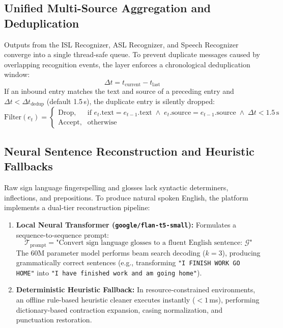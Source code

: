 \documentclass[12pt,a4paper]{report}
\begin{document}
\subsection{Unified Multi-Source Aggregation and Deduplication}
Outputs from the ISL Recognizer, ASL Recognizer, and Speech Recognizer converge into a single thread-safe queue. To prevent duplicate messages caused by overlapping recognition events, the layer enforces a chronological deduplication window:
\begin{equation}
\Delta t = t_{\text{current}} - t_{\text{last}}
\end{equation}
If an inbound entry matches the text and source of a preceding entry and $\Delta t < \Delta t_{\text{dedup}}$ (default 1.5\,s), the duplicate entry is silently dropped:
\begin{equation}
\text{Filter}(e_t) = \begin{cases}
\text{Drop}, & \text{if } e_t.\text{text} = e_{t-1}.\text{text} \;\land\; e_t.\text{source} = e_{t-1}.\text{source} \;\land\; \Delta t < 1.5\,\text{s} \\
\text{Accept}, & \text{otherwise}
\end{cases}
\end{equation}

\subsection{Neural Sentence Reconstruction and Heuristic Fallbacks}
Raw sign language fingerspelling and glosses lack syntactic determiners, inflections, and prepositions. To produce natural spoken English, the platform implements a dual-tier reconstruction pipeline:
\begin{enumerate}
\item \textbf{Local Neural Transformer (\texttt{google/flan-t5-small}):} Formulates a sequence-to-sequence prompt:
\begin{equation*}
\mathcal{T}_{\text{prompt}} = \text{"Convert sign language glosses to a fluent English sentence: } \mathcal{G}\text{"}
\end{equation*}
The 60M parameter model performs beam search decoding ($k=3$), producing grammatically correct sentences (e.g., transforming \texttt{"I FINISH WORK GO HOME"} into \texttt{"I have finished work and am going home"}).
\item \textbf{Deterministic Heuristic Fallback:} In resource-constrained environments, an offline rule-based heuristic cleaner executes instantly ($<1$\,ms), performing dictionary-based contraction expansion, casing normalization, and punctuation restoration.
\end{enumerate}
\end{document}
